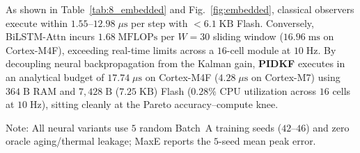 \documentclass[11pt,a4paper]{article}
\providecommand{\upmu}{\mu}
\begin{document}
As shown in Table~\ref{tab:8_embedded} and Fig.~\ref{fig:embedded}, classical observers execute within $1.55\text{--}12.98\;\upmu\mathrm{s}$ per step with $<6.1\;\mathrm{KB}$ Flash. Conversely, BiLSTM-Attn incurs $1.68\;\mathrm{MFLOPs}$ per $W=30$ sliding window ($16.96\;\mathrm{ms}$ on Cortex-M4F), exceeding real-time limits across a $16$-cell module at $10\;\mathrm{Hz}$. By decoupling neural backpropagation from the Kalman gain, \textbf{PIDKF} executes in an analytical budget of $17.74\;\upmu\mathrm{s}$ on Cortex-M4F ($4.28\;\upmu\mathrm{s}$ on Cortex-M7) using $364\;\mathrm{B}$ RAM and $7,428\;\mathrm{B}$ ($7.25\;\mathrm{KB}$) Flash ($0.28\%$ CPU utilization across $16$ cells at $10\;\mathrm{Hz}$), sitting cleanly at the Pareto accuracy--compute knee.

\begin{table}[htbp]
\caption{Tier~2 five-seed PIDKF ablation on unseen degraded UDDS ($85\%$ SOH, $25^\circ\text{C}$ and $0^\circ\text{C}$; Mean$\pm$SD over seeds $42\text{--}46$).\label{tab:9_pidkf}}
%
\vspace{2pt}
{\raggedright\scriptsize Note: All neural variants use $5$ random Batch~A training seeds ($42\text{--}46$) and zero oracle aging/thermal leakage; MaxE reports the $5$-seed mean peak error.\par}
\end{table}
\end{document}
